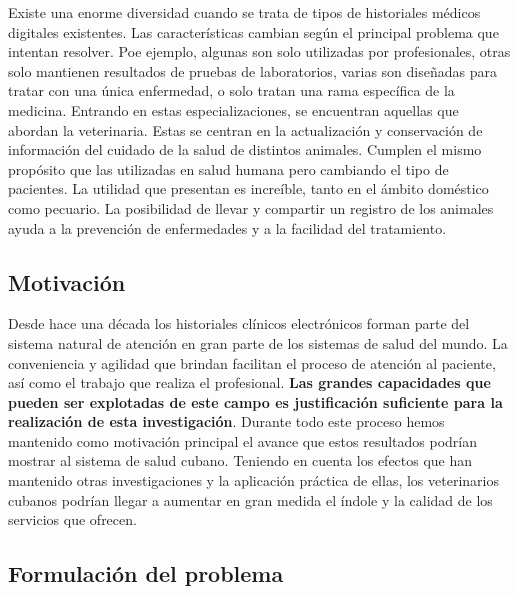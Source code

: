Existe una enorme diversidad cuando se trata de tipos de historiales m\'edicos digitales existentes. Las caracter\'isticas cambian seg\'un el principal problema que intentan resolver. Poe ejemplo, algunas son solo utilizadas por profesionales, otras solo mantienen resultados de pruebas de laboratorios, varias son diseñadas para tratar con una \'unica enfermedad, o solo tratan una rama espec\'ifica de la medicina. Entrando en estas especializaciones, se encuentran aquellas que abordan la veterinaria. Estas se centran en la actualización y conservación de informaci\'on del cuidado de la salud de distintos animales. Cumplen el mismo prop\'osito que las utilizadas en salud humana pero cambiando el tipo de pacientes. La utilidad que presentan es incre\'ible, tanto en el \'ambito dom\'estico como pecuario. La posibilidad de llevar y compartir un registro de los animales ayuda a la prevenci\'on de enfermedades y a la facilidad del tratamiento. 

\subsection*{Motivaci\'on}

Desde hace una d\'ecada los historiales clínicos electr\'onicos forman parte del sistema natural de atenci\'on en gran parte de los sistemas de salud del mundo. La conveniencia y agilidad que brindan facilitan el proceso de atenci\'on al paciente, as\'i como el trabajo que realiza el profesional. \textbf{Las grandes capacidades que pueden ser explotadas de este campo es justificaci\'on suficiente para la realizaci\'on de esta investigaci\'on}. Durante todo este proceso hemos mantenido como motivaci\'on principal el avance que estos resultados podr\'ian mostrar al sistema de salud cubano. Teniendo en cuenta los efectos que han mantenido otras investigaciones y la aplicaci\'on pr\'actica de ellas, los veterinarios cubanos podr\'ian llegar a aumentar en gran medida el \'indole y la calidad de los servicios que ofrecen.

\subsection*{Formulaci\'on del problema}

